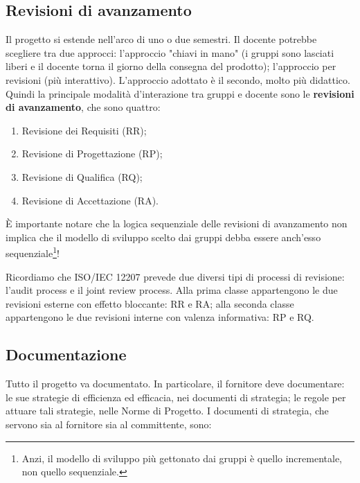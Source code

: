 \documentclass[a4paper]{article}
\begin{document}
		
	\subsection{Revisioni di avanzamento}

		
Il progetto si estende nell'arco di uno o due semestri. Il docente potrebbe scegliere tra due approcci: l'approccio "chiavi in mano" (i gruppi sono lasciati liberi e il docente torna il giorno della consegna del prodotto); l'approccio per revisioni (più interattivo). L'approccio adottato è il secondo, molto più didattico. Quindi la principale modalità d'interazione tra gruppi e docente sono le \textbf{revisioni di avanzamento}, che sono quattro:
		
	\begin{enumerate}
		
			
	\item Revisione dei Requisiti (RR);
			
	\item Revisione di Progettazione (RP);
			
	\item Revisione di Qualifica (RQ);
			
	\item Revisione di Accettazione (RA).
		
	\end{enumerate}

		
È importante notare che la logica sequenziale delle revisioni di avanzamento non implica che il modello di sviluppo scelto dai gruppi debba essere anch'esso sequenziale\footnote{Anzi, il modello di sviluppo più gettonato dai gruppi è quello incrementale, non quello sequenziale.}!
		
Ricordiamo che ISO/IEC 12207 prevede due diversi tipi di processi di revisione: l'audit process e il joint review process. Alla prima classe appartengono le due revisioni esterne con effetto bloccante: RR e RA; alla seconda classe appartengono le due revisioni interne con valenza informativa: RP e RQ.

		
	\subsection{Documentazione}

		
Tutto il progetto va documentato. In particolare, il fornitore deve documentare: le sue strategie di efficienza ed efficacia, nei documenti di strategia; le regole per attuare tali strategie, nelle Norme di Progetto. I documenti di strategia, che servono sia al fornitore sia al committente, sono:
		
\end{document}
